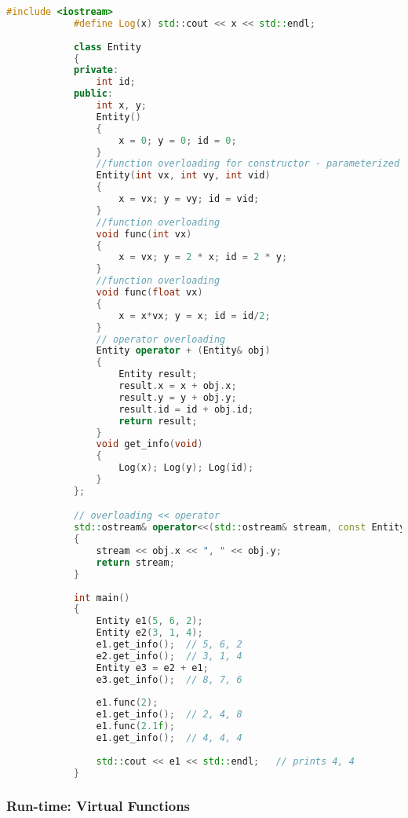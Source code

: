 \documentclass{article}
\begin{document}
        \begin{lstlisting}[language=C++, caption=Function \& operator overloading example]
            #include <iostream>
            #define Log(x) std::cout << x << std::endl;
            
            class Entity
            {
            private:
            	int id;
            public:
            	int x, y;
            	Entity()
            	{
            		x = 0; y = 0; id = 0;
            	}
            	//function overloading for constructor - parameterized
            	Entity(int vx, int vy, int vid)
            	{
            		x = vx;	y = vy; id = vid;
            	}
            	//function overloading
            	void func(int vx)
            	{
            		x = vx; y = 2 * x; id = 2 * y;
            	}
            	//function overloading
            	void func(float vx)
            	{
            		x = x*vx; y = x; id = id/2;
            	}
            	// operator overloading
            	Entity operator + (Entity& obj)
            	{
            		Entity result;
            		result.x = x + obj.x;
            		result.y = y + obj.y;
            		result.id = id + obj.id;
            		return result;
            	}
            	void get_info(void)
            	{
            		Log(x); Log(y); Log(id);
            	}
            };

            // overloading << operator
            std::ostream& operator<<(std::ostream& stream, const Entity& obj)
            {
            	stream << obj.x << ", " << obj.y;
            	return stream;
            }
            
            int main()
            {
            	Entity e1(5, 6, 2);
            	Entity e2(3, 1, 4);
            	e1.get_info();	// 5, 6, 2
            	e2.get_info();	// 3, 1, 4
            	Entity e3 = e2 + e1;
            	e3.get_info();	// 8, 7, 6
            
            	e1.func(2);
            	e1.get_info();	// 2, 4, 8
            	e1.func(2.1f);
            	e1.get_info();	// 4, 4, 4
            	
            	std::cout << e1 << std::endl;	// prints 4, 4
            }
        \end{lstlisting}
        
        \subsubsection{Run-time: Virtual Functions}
        
\end{document}
